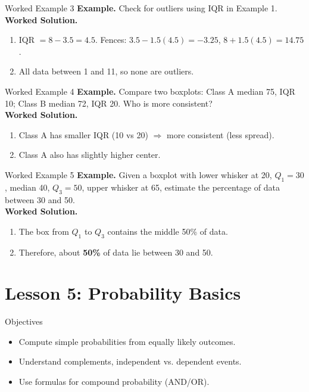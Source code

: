 \documentclass[aspectratio=169]{beamer}
\newcommand{\exampletitle}[1]{\vspace{0.25em}\textbf{Example.} #1\vspace{0.25em}}
\newcommand{\worked}{\textbf{Worked Solution.}}
\begin{document}
\begin{frame}{Worked Example 3}
\exampletitle{Check for outliers using IQR in Example 1.}\\[0.25em]
\worked
\begin{enumerate}
  \item IQR $=8-3.5=4.5$. Fences: $3.5-1.5(4.5)=-3.25$, $8+1.5(4.5)=14.75$.
  \item All data between 1 and 11, so none are outliers.
\end{enumerate}
\end{frame}

\begin{frame}{Worked Example 4}
\exampletitle{Compare two boxplots: Class A median 75, IQR 10; Class B median 72, IQR 20. Who is more consistent?}\\[0.25em]
\worked
\begin{enumerate}
  \item Class A has smaller IQR (10 vs 20) $\Rightarrow$ more consistent (less spread).
  \item Class A also has slightly higher center.
\end{enumerate}
\end{frame}

\begin{frame}{Worked Example 5}
\exampletitle{Given a boxplot with lower whisker at 20, $Q_1=30$, median 40, $Q_3=50$, upper whisker at 65, estimate the percentage of data between 30 and 50.}\\[0.25em]
\worked
\begin{enumerate}
  \item The box from $Q_1$ to $Q_3$ contains the middle 50\% of data.
  \item Therefore, about \textbf{50\%} of data lie between 30 and 50.
\end{enumerate}
\end{frame}

\section{Lesson 5: Probability Basics}

\begin{frame}{Objectives}
\begin{itemize}
  \item Compute simple probabilities from equally likely outcomes.
  \item Understand complements, independent vs. dependent events.
  \item Use formulas for compound probability (AND/OR).
\end{itemize}
\end{frame}
\end{document}
